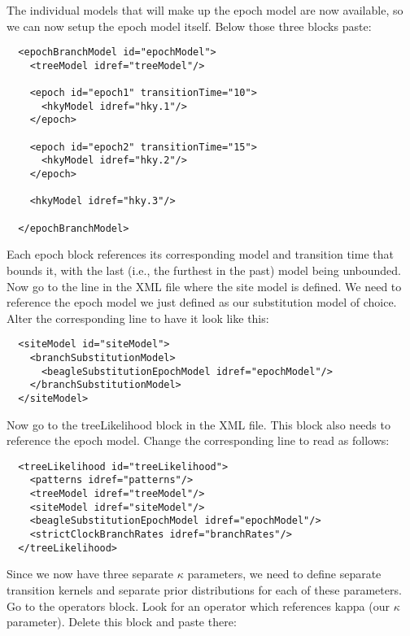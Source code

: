\medskip{}

The individual models that will make up the epoch model are now available, so we can now setup the epoch model itself.
Below those three blocks paste:

\medskip{}

\begin{lstlisting}
  <epochBranchModel id="epochModel">
    <treeModel idref="treeModel"/>

    <epoch id="epoch1" transitionTime="10">
      <hkyModel idref="hky.1"/>
    </epoch>

    <epoch id="epoch2" transitionTime="15">
      <hkyModel idref="hky.2"/>
    </epoch>

    <hkyModel idref="hky.3"/>

  </epochBranchModel>
\end{lstlisting}

\medskip{}

Each {\color{darkblue}epoch} block references its corresponding model and transition time that bounds it, with the last (i.e., the furthest in the past) model being unbounded.
Now go to the line in the XML file where the site model is defined.
We need to reference the epoch model we just defined as our substitution model of choice.
Alter the corresponding line to have it look like this:

\medskip{}

\begin{lstlisting}
  <siteModel id="siteModel">
    <branchSubstitutionModel> 
      <beagleSubstitutionEpochModel idref="epochModel"/>
    </branchSubstitutionModel> 
  </siteModel>
\end{lstlisting}

\medskip{}

Now go to the {\color{darkblue}treeLikelihood} block in the XML file. 
This block also needs to reference the epoch model.
Change the corresponding line to read as follows:

\medskip{}

\begin{lstlisting}
  <treeLikelihood id="treeLikelihood">
    <patterns idref="patterns"/>
    <treeModel idref="treeModel"/>
    <siteModel idref="siteModel"/>
    <beagleSubstitutionEpochModel idref="epochModel"/>  
    <strictClockBranchRates idref="branchRates"/>
  </treeLikelihood>
\end{lstlisting}

\medskip{}

Since we now have three separate $\kappa$ parameters, we need to define separate transition kernels and separate prior distributions for each of these parameters.
Go to the {\color{darkblue}operators} block. 
Look for an operator which references kappa (our $\kappa$ parameter).
Delete this block and paste there:

